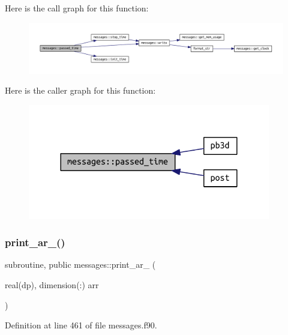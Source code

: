 Here is the call graph for this function\+:
\nopagebreak
\begin{figure}[H]
\begin{center}
\leavevmode
\includegraphics[width=350pt]{namespacemessages_aced7e14a8b4fbed8eae60217b71ca546_cgraph}
\end{center}
\end{figure}
Here is the caller graph for this function\+:
\nopagebreak
\begin{figure}[H]
\begin{center}
\leavevmode
\includegraphics[width=300pt]{namespacemessages_aced7e14a8b4fbed8eae60217b71ca546_icgraph}
\end{center}
\end{figure}
\mbox{\label{namespacemessages_a5686118397930f505259225f3688216b}} 
\subsubsection{\texorpdfstring{print\+\_\+ar\+\_()}{print\_ar\_1()}}
{\footnotesize\ttfamily subroutine, public messages\+::print\+\_\+ar\+\_ (\begin{DoxyParamCaption}\item[{real(dp), dimension(\+:)}]{arr }\end{DoxyParamCaption})}



Definition at line 461 of file messages.\+f90.

